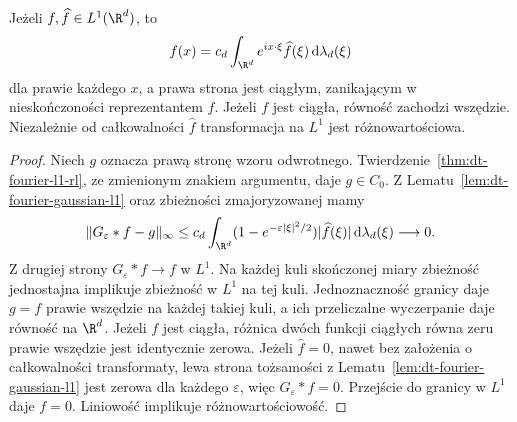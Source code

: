 \begin{twierdzenie}
\label{thm:dt-fourier-l1-inversion}
Jeżeli $f,\widehat f\in L^1(\R^d)$, to
\[
 f(x)=c_d\int_{\R^d}e^{ix\cdot\xi}\widehat f(\xi)
 \,\mathrm d\lambda_d(\xi)
\]
dla prawie każdego $x$, a prawa strona jest ciągłym,
zanikającym w nieskończoności reprezentantem $f$.
Jeżeli $f$ jest ciągła, równość zachodzi wszędzie.
Niezależnie od całkowalności $\widehat f$ transformacja
na $L^1$ jest różnowartościowa.
\end{twierdzenie}
\begin{proof}
Niech $g$ oznacza prawą stronę wzoru odwrotnego.
Twierdzenie~\ref{thm:dt-fourier-l1-rl}, ze zmienionym
znakiem argumentu, daje $g\in C_0$.
Z Lematu~\ref{lem:dt-fourier-gaussian-l1} oraz
zbieżności zmajoryzowanej mamy
\[
 \|G_\varepsilon*f-g\|_\infty
 \le c_d\int_{\R^d}
 (1-e^{-\varepsilon|\xi|^2/2})|\widehat f(\xi)|
 \,\mathrm d\lambda_d(\xi)\longrightarrow0.
\]
Z drugiej strony $G_\varepsilon*f\to f$ w $L^1$.
Na każdej kuli skończonej miary zbieżność jednostajna
implikuje zbieżność w $L^1$ na tej kuli. Jednoznaczność
granicy daje $g=f$ prawie wszędzie na każdej takiej kuli,
a ich przeliczalne wyczerpanie daje równość na $\R^d$.
Jeżeli $f$ jest ciągła, różnica dwóch funkcji ciągłych
równa zeru prawie wszędzie jest identycznie zerowa.
Jeżeli $\widehat f=0$, nawet bez założenia o
całkowalności transformaty, lewa strona tożsamości
z Lematu~\ref{lem:dt-fourier-gaussian-l1} jest zerowa
dla każdego $\varepsilon$, więc $G_\varepsilon*f=0$.
Przejście do granicy w $L^1$ daje $f=0$.
Liniowość implikuje różnowartościowość.
\end{proof}

